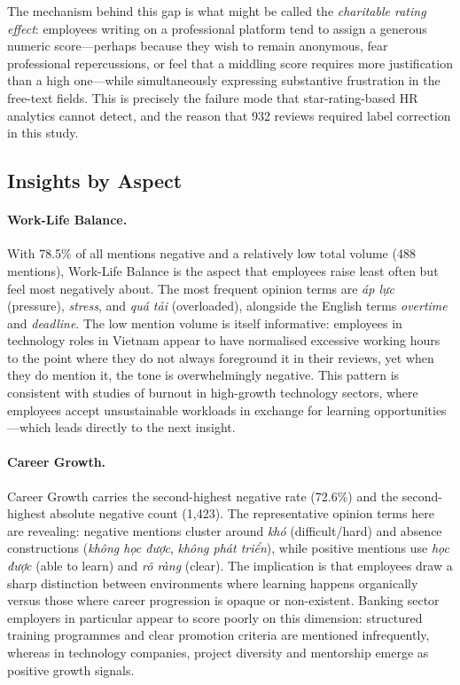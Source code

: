 \documentclass[12pt, a4paper]{article}
\begin{document}
The mechanism behind this gap is what might be called the \textit{charitable rating effect}: employees writing on a professional platform tend to assign a generous numeric score---perhaps because they wish to remain anonymous, fear professional repercussions, or feel that a middling score requires more justification than a high one---while simultaneously expressing substantive frustration in the free-text fields. This is precisely the failure mode that star-rating-based HR analytics cannot detect, and the reason that 932 reviews required label correction in this study.

\subsection{Insights by Aspect}

\paragraph{Work-Life Balance.} With 78.5\% of all mentions negative and a relatively low total volume (488 mentions), Work-Life Balance is the aspect that employees raise least often but feel most negatively about. The most frequent opinion terms are \textit{áp lực} (pressure), \textit{stress}, and \textit{quá tải} (overloaded), alongside the English terms \textit{overtime} and \textit{deadline}. The low mention volume is itself informative: employees in technology roles in Vietnam appear to have normalised excessive working hours to the point where they do not always foreground it in their reviews, yet when they do mention it, the tone is overwhelmingly negative. This pattern is consistent with studies of burnout in high-growth technology sectors, where employees accept unsustainable workloads in exchange for learning opportunities---which leads directly to the next insight.

\paragraph{Career Growth.} Career Growth carries the second-highest negative rate (72.6\%) and the second-highest absolute negative count (1,423). The representative opinion terms here are revealing: negative mentions cluster around \textit{khó} (difficult/hard) and absence constructions (\textit{không học được}, \textit{không phát triển}), while positive mentions use \textit{học được} (able to learn) and \textit{rõ ràng} (clear). The implication is that employees draw a sharp distinction between environments where learning happens organically versus those where career progression is opaque or non-existent. Banking sector employers in particular appear to score poorly on this dimension: structured training programmes and clear promotion criteria are mentioned infrequently, whereas in technology companies, project diversity and mentorship emerge as positive growth signals.
\end{document}

